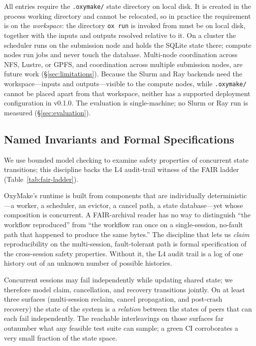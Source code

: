 \documentclass[12pt,a4paper]{article}
\newcommand{\code}[1]{{\texttt{\small\color{inlinecode}#1}}}
\begin{document}
\noindent All entries require the \code{.oxymake/} state directory on
local disk. It is created in the process working directory and cannot be
relocated, so in practice the requirement is on the \emph{workspace}: the
directory \code{ox run} is invoked from must be on local disk, together
with the inputs and outputs resolved relative to it. On a cluster the
scheduler runs on the submission node and holds the SQLite state there;
compute nodes run jobs and never touch the database. Multi-node
coordination across NFS, Lustre, or GPFS, and coordination across
multiple submission nodes, are future work (\S\ref{sec:limitations}).
Because the Slurm and Ray backends need the workspace---inputs and
outputs---visible to the compute nodes, while \code{.oxymake/} cannot
be placed apart from that workspace, neither has a
supported deployment configuration in v0.1.0. The evaluation is
single-machine; no Slurm or Ray run is measured
(\S\ref{sec:evaluation}).

\subsection{Named Invariants and Formal Specifications}
\label{sec:named-invariants}

We use bounded model checking to examine safety properties of
concurrent state transitions; this discipline backs the L4 audit-trail
witness of the FAIR ladder (Table~\ref{tab:fair-ladder}).

OxyMake's runtime is built from components that are individually
deterministic---a worker, a scheduler, an evictor, a cancel path, a
state database---yet whose composition is concurrent. A FAIR-archival
reader has no way to distinguish ``the workflow reproduced'' from
``the workflow ran once on a single-session, no-fault path that
happened to produce the same bytes.'' The discipline that lets us
\emph{claim} reproducibility on the multi-session, fault-tolerant
path is formal specification of the cross-session safety properties.
Without it, the L4 audit trail is a log of one history out of an
unknown number of possible histories.

Concurrent sessions may fail independently while updating shared
state; we therefore model claim, cancellation, and recovery
transitions jointly. On at least three surfaces (multi-session
reclaim, cancel propagation, and post-crash recovery) the state of the
system is a \emph{relation} between the states of peers that can each
fail independently. The reachable interleavings on those surfaces
far outnumber what any feasible test suite can sample; a green CI
corroborates a very small fraction of the state space.
\end{document}
